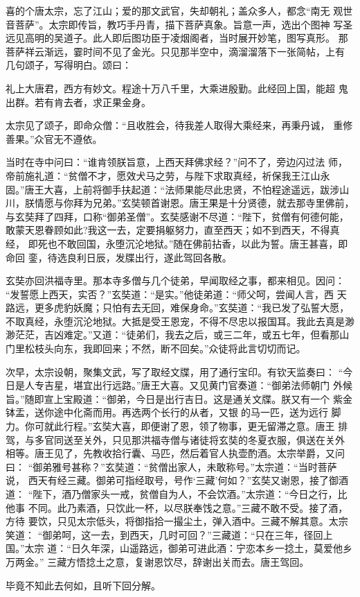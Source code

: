 喜的个唐太宗，忘了江山；爱的那文武官，失却朝礼；盖众多人，都念“南无
观世音菩萨”。太宗即传旨，教巧手丹青，描下菩萨真象。旨意一声，选出个图神
写圣远见高明的吴道子。此人即后图功臣于凌烟阁者，当时展开妙笔，图写真形。
那菩萨祥云渐远，霎时间不见了金光。只见那半空中，滴溜溜落下一张简帖，上有
几句颂子，写得明白。颂曰：

礼上大唐君，西方有妙文。程途十万八千里，大乘进殷勤。此经回上国，能超
鬼出群。若有肯去者，求正果金身。

太宗见了颂子，即命众僧：“且收胜会，待我差人取得大乘经来，再秉丹诚，
重修善果。”众官无不遵依。

当时在寺中问曰：“谁肯领朕旨意，上西天拜佛求经？”问不了，旁边闪过法
师，帝前施礼道：“贫僧不才，愿效犬马之劳，与陛下求取真经，祈保我王江山永
固。”唐王大喜，上前将御手扶起道：“法师果能尽此忠贤，不怕程途遥远，跋涉山
川，朕情愿与你拜为兄弟。”玄奘顿首谢恩。唐王果是十分贤德，就去那寺里佛前，
与玄奘拜了四拜，口称“御弟圣僧”。玄奘感谢不尽道：“陛下，贫僧有何德何能，
敢蒙天恩眷顾如此?我这一去，定要捐躯努力，直至西天；如不到西天，不得真经，
即死也不敢回国，永堕沉沦地狱。”随在佛前拈香，以此为誓。唐王甚喜，即命回
銮，待选良利日辰，发牒出行，遂此驾回各散。

玄奘亦回洪福寺里。那本寺多僧与几个徒弟，早闻取经之事，都来相见。因问：
“发誓愿上西天，实否？”玄奘道：“是实。”他徒弟道：“师父呵，尝闻人言，西
天路远，更多虎豹妖魔；只怕有去无回，难保身命。”玄奘道：“我已发了弘誓大愿，
不取真经，永堕沉沦地狱。大抵是受王恩宠，不得不尽忠以报国耳。我此去真是渺
渺茫茫，吉凶难定。”又道：“徒弟们，我去之后，或三二年，或五七年，但看那山
门里松枝头向东，我即回来；不然，断不回矣。”众徒将此言切切而记。

次早，太宗设朝，聚集文武，写了取经文牒，用了通行宝印。有钦天监奏曰：
“今日是人专吉星，堪宜出行远路。”唐王大喜。又见黄门官奏道：“御弟法师朝门
外候旨。”随即宣上宝殿道：“御弟，今日是出行吉日。这是通关文牒。朕又有一个
紫金钵盂，送你途中化斋而用。再选两个长行的从者，又银的马一匹，送为远行
脚力。你可就此行程。”玄奘大喜，即便谢了恩，领了物事，更无留滞之意。唐王
排驾，与多官同送至关外，只见那洪福寺僧与诸徒将玄奘的冬夏衣服，俱送在关外
相等。唐王见了，先教收拾行囊、马匹，然后着官人执壶酌酒。太宗举爵，又问曰：
“御弟雅号甚称？”玄奘道：“贫僧出家人，未敢称号。”太宗道：“当时菩萨说，
西天有经三藏。御弟可指经取号，号作‘三藏’何如？”玄奘又谢恩，接了御酒道：
“陛下，酒乃僧家头一戒，贫僧自为人，不会饮酒。”太宗道：“今日之行，比他事
不同。此乃素酒，只饮此一杯，以尽朕奉饯之意。”三藏不敢不受。接了酒，方待
要饮，只见太宗低头，将御指拾一撮尘土，弹入酒中。三藏不解其意。太宗笑道：
“御弟呵，这一去，到西天，几时可回？”三藏道：“只在三年，径回上国。”太宗
道：“日久年深，山遥路远，御弟可进此酒：宁恋本乡一捻土，莫爱他乡万两金。”
三藏方悟捻土之意，复谢恩饮尽，辞谢出关而去。唐王驾回。

毕竟不知此去何如，且听下回分解。